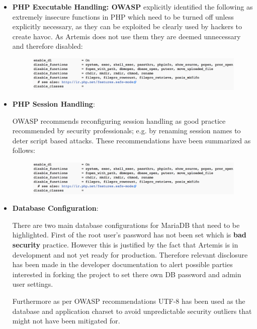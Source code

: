 \begin{itemize}
    
        \item \textbf{PHP Executable Handling\cite{OWASPb}: OWASP} \cite{OWASPb} explicitly identified the following as extremely insecure functions in PHP which need to be turned off unless explicitly necessary, as they can be exploited be clearly used by hackers to create havoc. As Artemis does not use them they are deemed unnecessary and therefore disabled:
            
            \begin{figure}[H]
            	\centering
            	\includegraphics[scale=0.44,center]{chapters/chapter03/figures/execPHP.png}
            	\label{PHPExec}
            \end{figure}

        \item \textbf{PHP Session Handling}\cite{OWASPb}:
        
        OWASP recommends reconfiguring session handling\cite{OWASPb} as good practice recommended by security professionals; e.g. by renaming session names to deter script based attacks. These recommendations have been summarized as follows:

            \begin{figure}[H]
            	\centering
            	\includegraphics[scale=0.44,center]{chapters/chapter03/figures/execPHP.png}
            	\label{PHPSess}
            \end{figure}  
            
        \item \textbf{Database Configuration}\cite{OWASPb}:
        
        There are two main database configurations for MariaDB that need to be highlighted. First of the root user's password has not been set which is \textbf{bad security} practice. However this is justified by the fact that Artemis is in development and not yet ready for production. Therefore relevant disclosure has been made in the developer documentation to alert possible parties interested in forking the project to set there own DB password and admin user settings.
        
        Furthermore as per OWASP recommendations UTF-8 has been used as the database and application charset to avoid unpredictable security outliers \cite{OWASPa,OWASPb} that might not have been mitigated for.
        

    \end{itemize}
    
